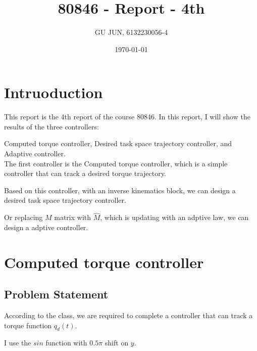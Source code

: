 \documentclass{article}
\title{80846 - Report - 4th}
\author{GU JUN, 6132230056-4}
\date{\today}
\begin{document}
\maketitle

\section*{Intruoduction}


This report is the 4th report of the course 80846. In this report, I will show the results of the three controllers:

Computed torque controller, Desired task space trajectory controller, and Adaptive controller.\\ 

The first controller is the Computed torque controller, which is a simple controller that can track a desired torque trajectory.

Based on this controller, with an inverse kinematics block, we can design a desired task space trajectory controller.

Or replacing $ M $ matrix with $\hat{M}$, which is updating with an adptive law, we can design a adptive controller.

\section{\centering \Large Computed torque controller}

\subsection*{Problem Statement}

According to the class, we are required to complete a controller that can track a torque function $q_d(t)$. 

I use the $sin$ function with $0.5 \pi$ shift on $y$.



\end{document}
